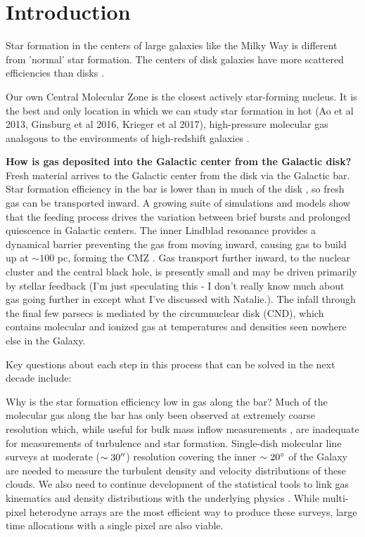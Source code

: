 \documentclass[modern]{aastex62}
\def\agnote#1{{\color{red}#1}}
\begin{document}
\section{Introduction}

Star formation in the centers of large galaxies like the Milky Way is different from 'normal' star formation. %
The centers of disk galaxies have more scattered efficiencies than disks \citep{Leroy2013a}. 

Our own Central Molecular Zone is the closest actively star-forming nucleus.
It is the best and only location in which we can study star formation in hot
(Ao et al 2013, Ginsburg et al 2016, Krieger et al 2017), high-pressure
molecular gas analogous to the environments of high-redshift galaxies \citep{Kruijssen2013a}.






\textbf{How is gas deposited into the Galactic center from the Galactic disk?}
Fresh material arrives to the Galactic center from the disk via the Galactic bar.
Star formation efficiency in the bar is lower than in much of the disk
\citep[e.g.][]{Rieko2018a}, so fresh gas can be transported inward.
A growing suite of simulations and models
\citep{Krumholz2015a,Sormani2015a,Torrey2016a,Ridley2017a,Krumholz2017a,Sormani2018a,Jeffreson2018a}
show that the feeding process drives the variation between brief bursts and
prolonged quiescence in Galactic centers.  The inner Lindblad resonance provides
a dynamical barrier preventing the gas from moving inward, causing gas to build
up at $\sim100$ pc, forming the CMZ \citep{Krumholz2015a}.  Gas transport further
inward, to the nuclear cluster and the central black hole, is presently small
and may be driven primarily by stellar feedback \agnote{(I'm just speculating
this - I don't really know much about gas going further in except what I've
discussed with Natalie.)}.  The infall through the final few parsecs
is mediated by the circumnuclear disk (CND), which contains molecular and ionized
gas at temperatures and densities seen nowhere else in the Galaxy.


Key questions about each step in this process that can be solved in the next
decade include:

Why is the star formation efficiency low in gas along the bar?
Much of the molecular gas along the bar has only been observed at extremely
coarse resolution which, while useful for bulk mass inflow measurements
\citep[e.g.][]{Sormani2019a}, are inadequate for measurements of turbulence and
star formation.  Single-dish molecular line surveys at moderate
($\sim30\mbox{$^{\prime\prime}$}$) resolution covering the inner $\sim20^{\circ}$ of the Galaxy are
needed to measure the turbulent density and velocity distributions of these
clouds.  We also need to continue development of the statistical tools to link gas kinematics and
density distributions with the underlying physics
\citep{Koch2017a,Burkhart2018a}. While multi-pixel heterodyne arrays are the
most efficient way to produce these surveys, large time allocations with a
single pixel are also viable.
\end{document}
